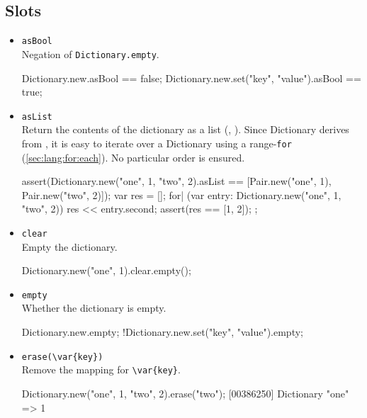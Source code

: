 \subsection{Slots}

\begin{itemize}
\item \lstinline|asBool|\\
  Negation of \lstinline|Dictionary.empty|.
\begin{urbiassert}[firstnumber=last]
Dictionary.new.asBool == false;
Dictionary.new.set("key", "value").asBool == true;
\end{urbiassert}

\item \lstinline|asList|\\
  Return the contents of the dictionary as a  list
  (, ).  Since Dictionary derives from
  , it is easy to iterate over a Dictionary
  using a range-\lstinline|for| (\autoref{sec:lang:for:each}).  No
  particular order is ensured.

\begin{urbiscript}[firstnumber=last]
assert(Dictionary.new("one", 1, "two", 2).asList
       == [Pair.new("one", 1), Pair.new("two", 2)]);
{
  var res = [];
  for| (var entry: Dictionary.new("one", 1, "two", 2))
    res << entry.second;
  assert(res == [1, 2]);
};
\end{urbiscript}

\item \lstinline|clear|\\
  Empty the dictionary.

\begin{urbiassert}[firstnumber=last]
Dictionary.new("one", 1).clear.empty();
\end{urbiassert}

\item \lstinline|empty|\\
  Whether the dictionary is empty.

\begin{urbiassert}[firstnumber=last]
Dictionary.new.empty;
!Dictionary.new.set("key", "value").empty;
\end{urbiassert}

\item \lstinline|erase(\var{key})|\\
  Remove the mapping for \lstinline|\var{key}|.

\begin{urbiscript}[firstnumber=last]
Dictionary.new("one", 1, "two", 2).erase("two");
[00386250] Dictionary {"one" => 1}
\end{urbiscript}


\end{itemize}
